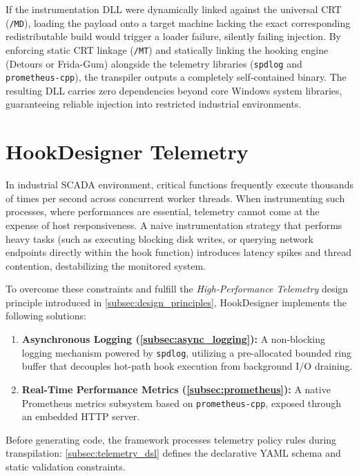 If the instrumentation \ac{DLL} were dynamically linked against the universal CRT (\texttt{/MD}), loading the payload onto a target machine lacking the exact corresponding redistributable build would trigger a loader failure, silently failing injection.
By enforcing static CRT linkage (\texttt{/MT}) and statically linking the hooking engine (Detours or Frida-Gum) alongside the telemetry libraries (\texttt{spdlog} and \texttt{prometheus-cpp}), the transpiler outputs a completely self-contained binary.
The resulting \ac{DLL} carries zero dependencies beyond core Windows system libraries, guaranteeing reliable injection into restricted industrial environments.


\section{HookDesigner Telemetry}
\label{sec:telemetry_engine}

In industrial SCADA environment, critical functions frequently execute thousands of times per second across concurrent worker threads.
When instrumenting such processes, where performances are essential, telemetry cannot come at the expense of host responsiveness.
A naive instrumentation strategy that performs heavy tasks (such as executing blocking disk writes, or querying network endpoints directly within the hook function) introduces latency spikes and thread contention, destabilizing the monitored system.

To overcome these constraints and fulfill the \emph{High-Performance Telemetry} design principle introduced in \cref{subsec:design_principles}, HookDesigner implements the following solutions:
\begin{enumerate}
	\item \textbf{Asynchronous Logging (\cref{subsec:async_logging}):} A non-blocking logging mechanism powered by \texttt{spdlog}, utilizing a pre-allocated bounded ring buffer that decouples hot-path hook execution from background I/O draining.
	\item \textbf{Real-Time Performance Metrics (\cref{subsec:prometheus}):} A native Prometheus metrics subsystem based on \texttt{prometheus-cpp}, exposed through an embedded HTTP server.
\end{enumerate}

Before generating code, the framework processes telemetry policy rules during transpilation: \cref{subsec:telemetry_dsl} defines the declarative YAML schema and static validation constraints.

